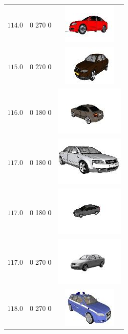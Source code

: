 \begin{longtable}{ccc}
	$114.0$ & 0 270 0 & \includegraphics{models/9171272d0e357c40435b5ce06ecf3e86.jpg}\\
	$115.0$ & 0 270 0 & \includegraphics{models/287cfe67f3718d1937a7dd6224232260.jpg}\\
	$116.0$ & 0 180 0 & \includegraphics{models/4288f27cc67cb5a8bb502cd7593da1c5.jpg}\\
	$117.0$ & 0 180 0 & \includegraphics{models/4e0660d80d38541aa69dfdc5532bb13.jpg}\\
	$117.0$ & 0 180 0 & \includegraphics{models/c2d49581d8a133943b4ae925d9bc4655.jpg}\\
	$117.0$ & 0 270 0 & \includegraphics{models/eaaf68cd067f0c0d500d6d7fde0bb569.jpg}\\
	$118.0$ & 0 270 0 & \includegraphics{models/76db1c2c53d7d17055935957cd38dfda.jpg}\\

\end{longtable}
